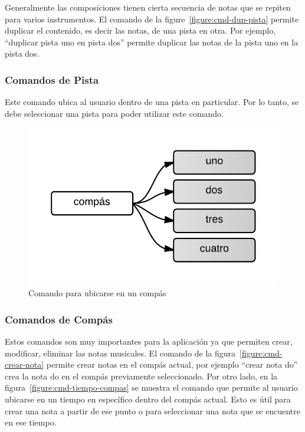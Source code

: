 Generalmente las composiciones tienen cierta secuencia de notas que se repiten para varios instrumentos. El comando de la 
figure~\ref{figure:cmd-dup-pista} permite duplicar el contenido, es decir las notas, de una pista en otra. Por ejemplo, 
``duplicar pista uno en pista dos'' permite duplicar las notas de la pista uno en la pista dos.

\subsubsection{Comandos de Pista} 

Este comando ubica al usuario dentro de una pista en particular. Por lo tanto, se debe
seleccionar una pista para poder utilizar este comando.

\begin{figure}[H] 
\centering
\includegraphics[width=0.4\linewidth]{./graphics/cmd-compas.png}
\caption{Comando para ubicarse en un comp\'as}
\label{figure:cmd-compas}
\quad
\end{figure}

\subsubsection{Comandos de Comp\'as}

Estos comandos son muy importantes para la aplicaci\'on ya que permiten crear, modificar, 
eliminar las notas musicales. El comando de la figura~\ref{figure:cmd-crear-nota} permite crear notas en el  
comp\'as actual, por ejemplo ``crear nota do'' crea la nota do en el comp\'as previamente seleccionado. Por otro lado, en la figura~\ref{figure:cmd-tiempo-compas} 
se muestra el comando que permite al usuario ubicarse en un  
tiempo en espec\'ifico dentro del comp\'as actual. Esto es \'util para crear una nota a partir de ese punto o 
para seleccionar una nota que se encuentre en ese tiempo.

